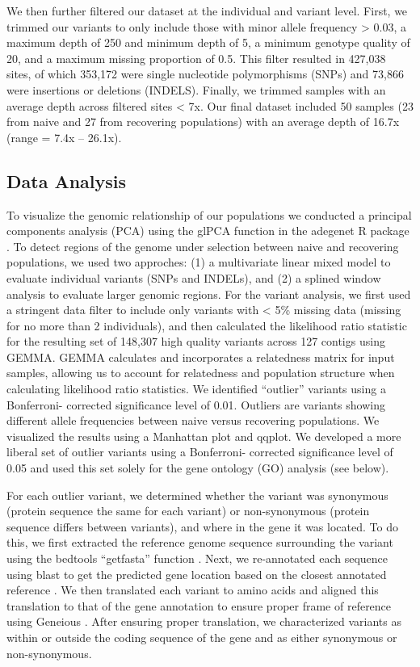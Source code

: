 \documentclass[9pt,twocolumn,twoside,lineno]{pnas-new}
\begin{document}
{We then further filtered our dataset at the individual and variant
level. First, we trimmed our variants to only include those with minor
allele frequency \textgreater{} 0.03, a maximum depth of 250 and minimum
depth of 5, a minimum genotype quality of 20, and a maximum missing
proportion of 0.5. This filter resulted in 427,038 sites, of which
353,172 were single nucleotide polymorphisms (SNPs) and 73,866 were
insertions or deletions (INDELS). Finally, we trimmed samples with an
average depth across filtered sites \textless{} 7x. Our final dataset
included 50 samples (23 from naive and 27 from recovering populations)
with an average depth of 16.7x (range = 7.4x -- 26.1x).

\hypertarget{data-analysis}{%
\subsection*{Data Analysis}\label{data-analysis}}

To visualize the genomic relationship of our populations we conducted a
principal components analysis (PCA) using the glPCA function in the
adegenet R package \citep{jombart2008}. To detect regions of the genome
under selection between naive and recovering populations, we used two
approches: (1) a multivariate linear mixed model to evaluate individual
variants (SNPs and INDELs), and (2) a splined window analysis to
evaluate larger genomic regions. For the variant analysis, we first used
a stringent data filter to include only variants with \textless{} 5\%
missing data (missing for no more than 2 individuals), and then
calculated the likelihood ratio statistic for the resulting set of
148,307 high quality variants across 127 contigs using GEMMA. GEMMA
calculates and incorporates a relatedness matrix for input samples,
allowing us to account for relatedness and population structure when
calculating likelihood ratio statistics. We identified ``outlier''
variants using a Bonferroni- corrected significance level of 0.01.
Outliers are variants showing different allele frequencies between naive
versus recovering populations. We visualized the results using a
Manhattan plot and qqplot. We developed a more liberal set of outlier
variants using a Bonferroni- corrected significance level of 0.05 and
used this set solely for the gene ontology (GO) analysis (see below).

For each outlier variant, we determined whether the variant was
synonymous (protein sequence the same for each variant) or
non-synonymous (protein sequence differs between variants), and where in
the gene it was located. To do this, we first extracted the reference
genome sequence surrounding the variant using the bedtools ``getfasta''
function \citep{quinlan2010}. Next, we re-annotated each sequence using
blast to get the predicted gene location based on the closest annotated
reference \citep{altschul1997}. We then translated each variant to amino
acids and aligned this translation to that of the gene annotation to
ensure proper frame of reference using Geneious \citep{kearse2012}.
After ensuring proper translation, we characterized variants as within
or outside the coding sequence of the gene and as either synonymous or
non-synonymous.

}
\end{document}
